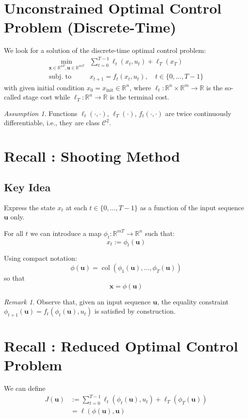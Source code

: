 \documentclass[openany]{book}
\DeclareMathOperator{\col}{col}           %
\newcommand{\R}{\mathbb{R}}               %
\theoremstyle{definition}
\theoremstyle{remark}
\newtheorem*{remark}{Remark}
\newtheorem*{assumption}{Assumption}
\begin{document}
\section{Unconstrained Optimal Control Problem (Discrete-Time)}
We look for a solution of the discrete-time optimal control problem:
\begin{align*}
    \min_{\mathbf{x}\in\R^{nT},\mathbf{u}\in\R^{mT}} & \sum_{t=0}^{T-1}\ell_t(x_t,u_t)+\ell_T(x_T)\\
    \text{subj. to } & x_{t+1} = f_t(x_t,u_t), \quad t\in\{0,\dots,T-1\}
\end{align*}
with given initial condition $x_0 = x_{\text{init}} \in \R^n$, where $\ell_t:\R^n\times\R^m\to\R$ is the so-called stage cost while $\ell_T:\R^n\to\R$ is the terminal cost.

\begin{assumption}
Functions $\ell_t(\cdot,\cdot)$, $\ell_T(\cdot)$, $f_t(\cdot,\cdot)$ are twice continuously differentiable, i.e., they are class $\mathcal{C}^2$.
\end{assumption}

\section{Recall : Shooting Method}
\subsection{Key Idea}
Express the state $x_t$ at each $t\in\{0,\dots,T-1\}$ as a function of the input sequence $\mathbf{u}$ only.

For all $t$ we can introduce a map $\phi_t:\R^{mT}\to\R^n$ such that:
\[
    x_t := \phi_t(\mathbf{u})
\]

Using compact notation:
\[
    \phi(\mathbf{u}) = \col(\phi_1(\mathbf{u}),\dots,\phi_T(\mathbf{u}))
\]
so that
\[
    \mathbf{x} = \phi(\mathbf{u})
\]

\begin{remark}
Observe that, given an input sequence $\mathbf{u}$, the equality constraint $\phi_{t+1}(\mathbf{u}) = f_t(\phi_t(\mathbf{u}),u_t)$ is satisfied by construction.
\end{remark}

\section{Recall : Reduced Optimal Control Problem}
We can define
\begin{align*}
    J(\mathbf{u}) &:= \sum_{t=0}^{T-1} \ell_t(\phi_t(\mathbf{u}), u_t) + \ell_T(\phi_T(\mathbf{u}))\\
    &= \ell(\phi(\mathbf{u}), \mathbf{u})
\end{align*}
\end{document}
